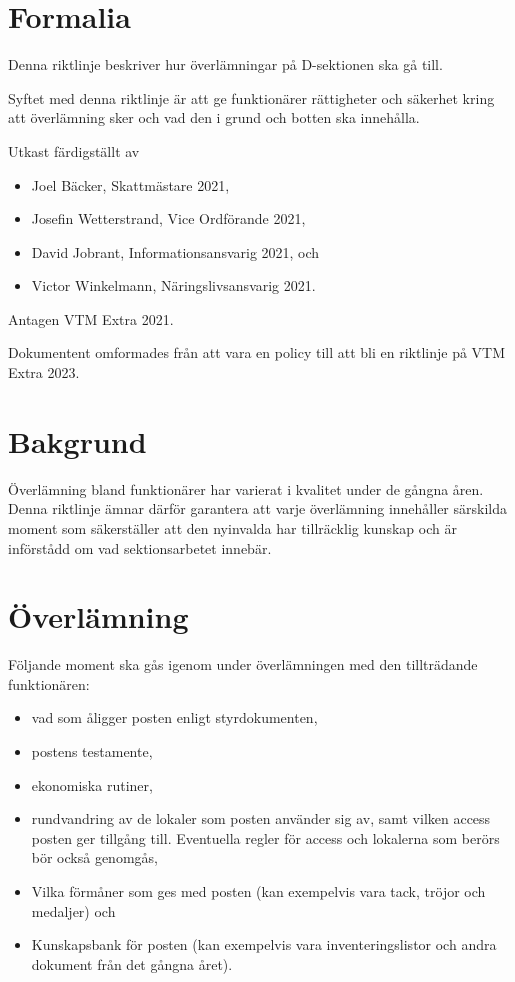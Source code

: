 \documentclass{dsekguideline}
\begin{document}
\maketitle
\section{Formalia}

Denna riktlinje beskriver hur överlämningar på D-sektionen ska gå till.

Syftet med denna riktlinje är att ge funktionärer rättigheter och säkerhet kring
att överlämning sker och vad den i grund och botten ska innehålla.

Utkast färdigställt av
\begin{itemize}
  \item Joel Bäcker, Skattmästare 2021,
  \item Josefin Wetterstrand, Vice Ordförande 2021,
  \item David Jobrant, Informationsansvarig 2021, och
  \item Victor Winkelmann, Näringslivsansvarig 2021.
  \end{itemize}
Antagen VTM Extra 2021.

Dokumentent omformades från att vara en policy till att bli en riktlinje på
VTM Extra 2023.

\section{Bakgrund}

Överlämning bland funktionärer har varierat i kvalitet under de gångna
åren. Denna riktlinje ämnar därför garantera att varje överlämning innehåller
särskilda moment som säkerställer att den nyinvalda har tillräcklig kunskap
och är införstådd om vad sektionsarbetet innebär.

\section{Överlämning}

Följande moment ska gås igenom under överlämningen med den tillträdande
funktionären:
\begin{itemize}
\item vad som åligger posten enligt styrdokumenten,
\item postens testamente,
\item ekonomiska rutiner,
\item rundvandring av de lokaler som posten använder sig av, samt vilken access
  posten ger tillgång till. Eventuella regler för access och lokalerna som
  berörs bör också genomgås,
\item Vilka förmåner som ges med posten (kan exempelvis vara tack, tröjor och
  medaljer) och
\item Kunskapsbank för posten (kan exempelvis vara inventeringslistor och andra
  dokument från det gångna året).
\end{itemize}
\end{document}
